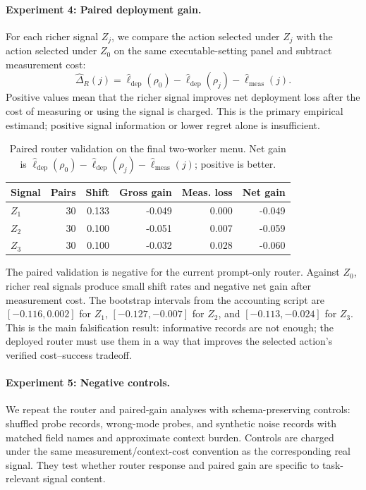 \documentclass{article}
\begin{document}
\paragraph{Experiment 4: Paired deployment gain.}
For each richer signal \(Z_j\), we compare the action selected under \(Z_j\) with the action selected under \(Z_0\) on the same executable-setting panel and subtract measurement cost:
\[
\widehat{\Delta}_R(j)=
\widehat{\ell}_{\mathrm{dep}}(\rho_0)-
\widehat{\ell}_{\mathrm{dep}}(\rho_j)-
\widehat{\ell}_{\mathrm{meas}}(j).
\]
Positive values mean that the richer signal improves net deployment loss after the cost of measuring or using the signal is charged.
This is the primary empirical estimand; positive signal information or lower regret alone is insufficient.

\begin{table}[t]
\centering
\small
\caption{Paired router validation on the final two-worker menu.
Net gain is \(\widehat{\ell}_{\mathrm{dep}}(\rho_0)-\widehat{\ell}_{\mathrm{dep}}(\rho_j)-\widehat{\ell}_{\mathrm{meas}}(j)\); positive is better.}
\label{tab:twomodel-router-gain}
\begin{tabular}{@{}lrrrrr@{}}
\toprule
Signal & Pairs & Shift & Gross gain & Meas. loss & Net gain \\
\midrule
\(Z_1\) & 30 & 0.133 & -0.049 & 0.000 & -0.049 \\
\(Z_2\) & 30 & 0.100 & -0.051 & 0.007 & -0.059 \\
\(Z_3\) & 30 & 0.100 & -0.032 & 0.028 & -0.060 \\
\bottomrule
\end{tabular}
\end{table}

The paired validation is negative for the current prompt-only router.
Against \(Z_0\), richer real signals produce small shift rates and negative net gain after measurement cost.
The bootstrap intervals from the accounting script are \([-0.116,0.002]\) for \(Z_1\), \([-0.127,-0.007]\) for \(Z_2\), and \([-0.113,-0.024]\) for \(Z_3\).
This is the main falsification result: informative records are not enough; the deployed router must use them in a way that improves the selected action's verified cost--success tradeoff.

\paragraph{Experiment 5: Negative controls.}
We repeat the router and paired-gain analyses with schema-preserving controls: shuffled probe records, wrong-mode probes, and synthetic noise records with matched field names and approximate context burden.
Controls are charged under the same measurement/context-cost convention as the corresponding real signal.
They test whether router response and paired gain are specific to task-relevant signal content.
\end{document}
